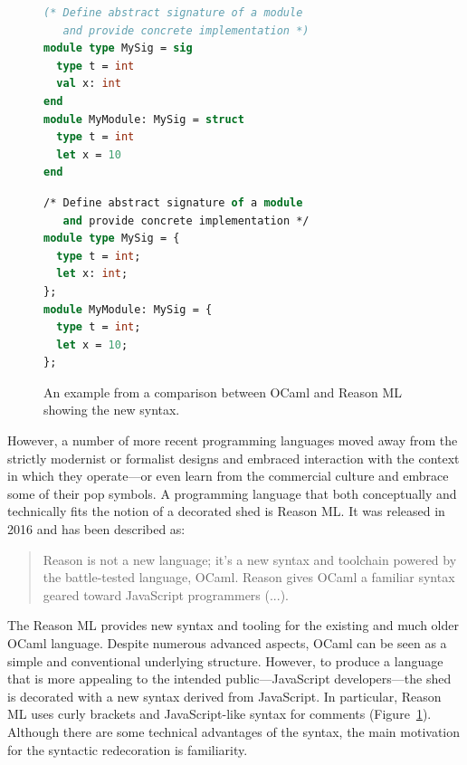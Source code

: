 \begin{figure}[t]
\begin{minipage}[t]{.5\textwidth}%
\begin{lstlisting}[language=ocaml]
(* Define abstract signature of a module
   and provide concrete implementation *)
module type MySig = sig
  type t = int
  val x: int
end
module MyModule: MySig = struct
  type t = int
  let x = 10
end
\end{lstlisting}
\end{minipage}
\begin{minipage}[t]{.5\textwidth}%
\begin{lstlisting}[language=ocaml]
/* Define abstract signature of a module
   and provide concrete implementation */
module type MySig = {
  type t = int;
  let x: int;
};
module MyModule: MySig = {
  type t = int;
  let x = 10;
};
\end{lstlisting}
\end{minipage}
\caption{An example from a comparison between OCaml and Reason ML showing the new syntax.}
\label{fig:reason}
\end{figure}

However, a number of more recent programming languages moved away from the strictly modernist or
formalist designs and embraced interaction with the context in which they operate---or even learn
from the commercial culture and embrace some of their pop symbols. A programming language that
both conceptually and technically fits the notion of a decorated shed is Reason ML.
It was released in 2016 and has been described as:

\begin{quote}
Reason is not a new language; it's a new syntax and toolchain powered by the battle-tested
language, OCaml. Reason gives OCaml a familiar syntax geared toward JavaScript programmers
(...).
\end{quote}

The Reason ML provides new syntax and tooling for the existing and much older OCaml language.
Despite numerous advanced aspects, OCaml can be seen as a simple and conventional underlying
structure. However, to produce a language that is more appealing to the intended public---JavaScript
developers---the shed is decorated with a new syntax derived from JavaScript. In particular,
Reason ML uses curly brackets and JavaScript-like syntax for comments (Figure~\ref{fig:reason}).
Although there are some technical advantages of the syntax, the main motivation for the
syntactic redecoration is familiarity.

